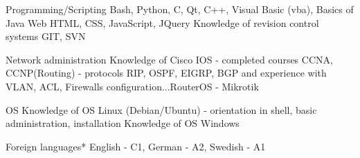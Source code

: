 \begin{cvskills}

  \vspace{5pt}
  
  \cvskill
    {Programming/Scripting} %
    {Bash, Python, C, Qt, C++, Visual Basic (vba), Basics of Java} %
  \vspace{5pt}
  \cvskill
    {Web} %
    {HTML, CSS, JavaScript, JQuery \newline Knowledge of revision control systems GIT, SVN}
  

  \vspace{5pt}
    
  \cvskill
    {Network administration} %
    {Knowledge of Cisco IOS - completed courses CCNA, CCNP(Routing) - protocols RIP, OSPF, EIGRP, BGP and \newline experience with VLAN, ACL, Firewalls configuration...\newline RouterOS - Mikrotik} %
  
  \vspace{5pt}
  \cvskill
    {OS}
    {Knowledge of OS Linux (Debian/Ubuntu) - orientation in shell, basic administration, installation \newline Knowledge of OS Windows}
  \vspace{5pt}
    
  \cvskill
    {Foreign languages*} %
    {English - C1, German - A2, Swedish - A1} %

\end{cvskills}